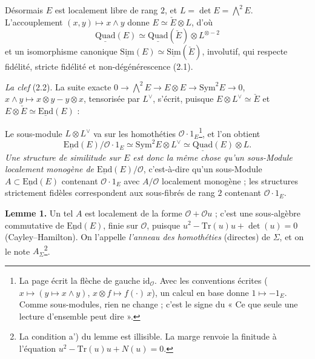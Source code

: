 \documentclass[11pt,a4paper]{article}
\begin{document}
Désormais $E$ est localement libre de rang $2$, et $L = \det E = \bigwedge^{2}E$.
L'accouplement $(x, y) \mapsto x \wedge y$ donne $E \simeq \check{E} \otimes L$, d'où
\[
  \underline{\mathrm{Quad}}(E) \simeq \underline{\mathrm{Quad}}(\check{E}) \otimes L^{\otimes -2}
\]
et un isomorphisme canonique $\underline{\mathrm{Sim}}(E) \simeq
\underline{\mathrm{Sim}}(\check{E})$, involutif, qui respecte fidélité, stricte
fidélité et non-dégénérescence (2.1).

\emph{La clef} (2.2). La suite exacte $0 \to \bigwedge^{2}E \to E \otimes E \to
\mathrm{Sym}^{2}E \to 0$, $x \wedge y \mapsto x \otimes y - y \otimes x$, tensorisée par
$L^{\vee}$, s'écrit, puisque $E \otimes L^{\vee} \simeq \check{E}$ et $E \otimes
\check{E} \simeq \underline{\mathrm{End}}(E)$ :


Le sous-module $L \otimes L^{\vee}$ va sur les homothéties $\mathcal{O}\cdot 1_E$\footnote{La
page écrit la flèche de gauche $\mathrm{id}_{\mathcal{O}}$. Avec les conventions
écrites ($x \mapsto (y \mapsto x \wedge y)$, $x \otimes f \mapsto f(\cdot)\,x$), un
calcul en base donne $1 \mapsto -1_E$. Comme sous-modules, rien ne change ; c'est
le signe du « Ce que seule une lecture d'ensemble peut dire ».}, et l'on obtient
\[
  \underline{\mathrm{End}}(E)/\mathcal{O}\cdot 1_E \simeq \mathrm{Sym}^{2}E \otimes L^{\vee}
  \simeq \underline{\mathrm{Quad}}(E) \otimes L .
\]
\emph{Une structure de similitude sur $E$ est donc la même chose qu'un sous-Module
localement monogène de $\underline{\mathrm{End}}(E)/\mathcal{O}$}, c'est-à-dire qu'un
sous-Module $A \subset \underline{\mathrm{End}}(E)$ contenant $\mathcal{O}\cdot 1_E$ avec
$A/\mathcal{O}$ localement monogène ; les structures strictement fidèles
correspondent aux sous-fibrés de rang $2$ contenant $\mathcal{O}\cdot 1_E$.

\textbf{Lemme 1.} Un tel $A$ est localement de la forme $\mathcal{O} + \mathcal{O}u$ ;
c'est une sous-algèbre commutative de $\underline{\mathrm{End}}(E)$, finie sur
$\mathcal{O}$, puisque $u^{2} - \mathrm{Tr}(u)u + \det(u) = 0$ (Cayley--Hamilton).
On l'appelle \emph{l'anneau des homothéties} (directes) de $\Sigma$, et on le note
$A_\Sigma$\footnote{La condition a') du lemme est illisible. La marge renvoie la
finitude à l'équation $u^{2} - \mathrm{Tr}(u)u + N(u) = 0$.}.
\end{document}
